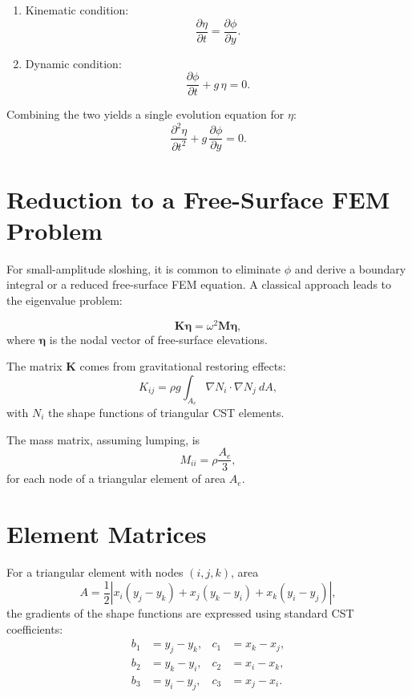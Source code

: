 \documentclass{article}
\begin{document}
\begin{enumerate}
    \item Kinematic condition:
    \begin{equation}
        \frac{\partial \eta}{\partial t} = \frac{\partial \phi}{\partial y}.
    \end{equation}

    \item Dynamic condition:
    \begin{equation}
        \frac{\partial \phi}{\partial t} + g \, \eta = 0.
    \end{equation}
\end{enumerate}

Combining the two yields a single evolution equation for $\eta$:
\begin{equation}
    \frac{\partial^2 \eta}{\partial t^2} + g \, \frac{\partial \phi}{\partial y} = 0.
\end{equation}

\section{Reduction to a Free-Surface FEM Problem}
For small-amplitude sloshing, it is common to eliminate $\phi$ and derive a boundary integral or a reduced free-surface FEM equation. A classical approach leads to the eigenvalue problem:

\begin{equation}
    \bm{K} \bm{\eta} = \omega^2 \bm{M} \bm{\eta},
\end{equation}
where $\bm{\eta}$ is the nodal vector of free-surface elevations.

The matrix $\bm{K}$ comes from gravitational restoring effects:
\begin{equation}
    K_{ij} = \rho g \int_{A_e} \nabla N_i \cdot \nabla N_j ~ dA,
\end{equation}
with $N_i$ the shape functions of triangular CST elements.

The mass matrix, assuming lumping, is
\begin{equation}
    M_{ii} = \rho \frac{A_e}{3},
\end{equation}
for each node of a triangular element of area $A_e$.

\section{Element Matrices}
For a triangular element with nodes $(i,j,k)$, area
\begin{equation}
    A = \frac{1}{2} | x_i(y_j - y_k) + x_j(y_k - y_i) + x_k(y_i - y_j) |,
\end{equation}
the gradients of the shape functions are expressed using standard CST coefficients:
\begin{align}
    b_1 &= y_j - y_k, & c_1 &= x_k - x_j, \\
    b_2 &= y_k - y_i, & c_2 &= x_i - x_k, \\
    b_3 &= y_i - y_j, & c_3 &= x_j - x_i.
\end{align}
\end{document}
